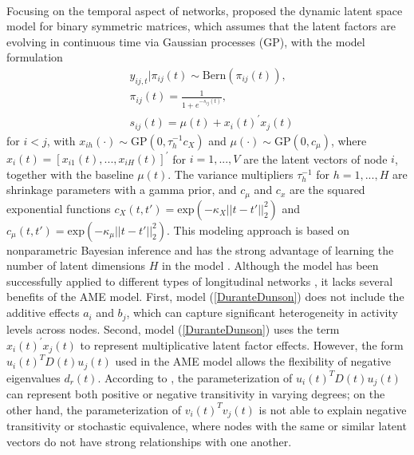 \documentclass[a4paper]{article}
\begin{document}
		\\ \newline Focusing on the temporal aspect of networks, \cite{durante2013nonparametric} proposed the dynamic latent space model for binary symmetric matrices, which 
		assumes that the latent factors are evolving in continuous time via Gaussian processes (GP), with the model formulation
		\begin{equation}\label{DuranteDunson}
			\begin{aligned}
				&y_{ij, t}|\pi_{ij}(t) \sim \mbox{Bern}(\pi_{ij}(t)),\\
				& \pi_{ij}(t) = \frac{1}{1+e^{-s_{ij}(t)}},\\
				& s_{ij}(t) = \mu(t) + x_i(t)^\prime x_j(t)
			\end{aligned}
		\end{equation}
		for $i<j$, with $x_{ih}(\cdot) \sim \mbox{GP}(0, \tau_h^{-1}c_X)$ and $\mu(\cdot) \sim \mbox{GP}(0, c_\mu)$,
		where $x_i(t)=[x_{i1}(t),...,x_{iH}(t)]^\prime$ for $i = 1,...,V$ are the latent vectors of node $i$, together with the baseline $\mu(t)$. The variance multipliers $\tau_h^{-1}$ for $h=1,...,H$ are shrinkage parameters with a gamma prior, and $c_\mu$ and $c_x$ are the squared exponential functions $c_X(t, t') = \mbox{exp}(-\kappa_X||t-t'||_2^2)$ and $c_\mu(t, t') = \mbox{exp}(-\kappa_\mu||t-t'||_2^2)$. This modeling approach is based on nonparametric Bayesian inference and has the strong advantage of learning the number of latent dimensions $H$ in the model \citep{bhattacharya2011sparse}. Although the model has been successfully applied to different types of longitudinal networks \citep{durante2014bayesian2,durante2014bayesian}, it lacks several benefits of the AME model. First, model (\ref{DuranteDunson}) does not include the additive effects $a_i$ and $b_j$, which can capture significant heterogeneity in activity levels across nodes. Second, model (\ref{DuranteDunson}) uses the term $x_i(t)^\prime x_j(t)$ to represent multiplicative latent factor effects. However, the form $u_i(t)^TD(t)u_j(t)$ used in the AME model allows the flexibility of negative eigenvalues $d_r(t)$. According to \cite{hoff2008modeling}, the parameterization of $u_i(t)^TD(t)u_j(t)$ can represent both positive or negative transitivity in varying degrees; on the other hand, the parameterization of $v_i(t)^Tv_j(t)$ is not able to explain negative transitivity or stochastic equivalence, where nodes with the same or similar latent vectors do not have strong relationships with one another.\\ \newline
\end{document}
